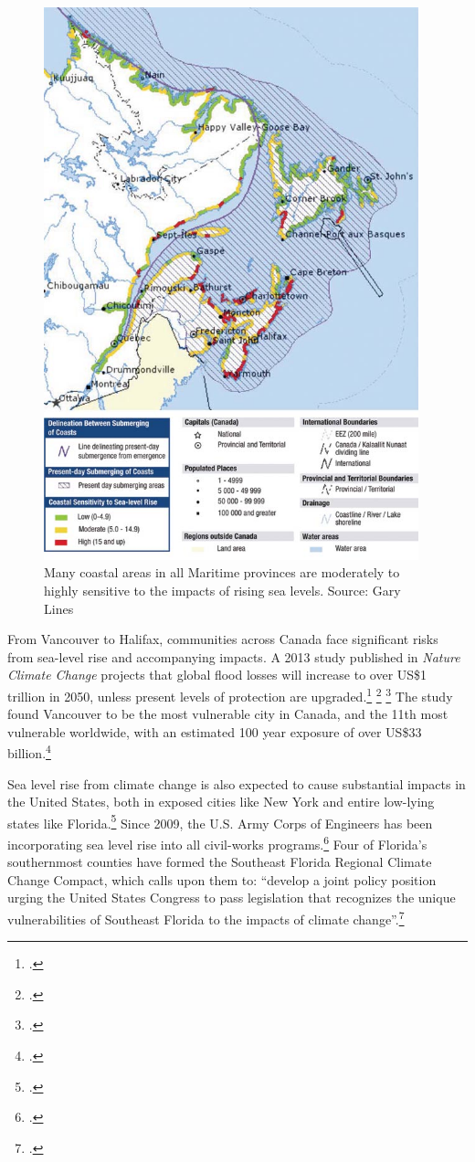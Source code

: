 \begin{figure}
\includegraphics[height=160mm]{s3-coastalsealevel.png}
\centering
\caption{Many coastal areas in all Maritime provinces are moderately to highly sensitive to the impacts of rising sea  levels. Source: Gary Lines}
\label{fig:s3-coastalsealevel}
\end{figure}



From Vancouver to Halifax, communities across Canada face significant risks from sea-level rise and accompanying impacts. A 2013 study published in \emph{Nature Climate Change} projects that global flood losses will increase to over US\$1 trillion in 2050, unless present levels of protection are upgraded.\footcite[][]{Hallegatte2013} \footcite[See also: ][]{Moore2013} \footcite[][]{VancouverFlooding2013}
The study found Vancouver to be the most vulnerable city in Canada, and the 11th most vulnerable worldwide, with an estimated 100 year exposure of over US\$33 billion.\footcite[][p. 2]{Hallegatte2013}



Sea level rise from climate change is also expected to cause substantial impacts in the United States, both in exposed cities like New York and entire low-lying states like Florida.\footcite[][]{EconGetWet}
Since 2009, the U.S. Army Corps of Engineers has been incorporating sea level rise into all civil-works programs.\footcite[][]{CorpsEngSeaLevel}
Four of Florida's southernmost counties have formed the Southeast Florida Regional Climate Change Compact, which calls upon them to: ``develop a joint policy position urging the United States Congress to pass legislation that recognizes the unique vulnerabilities of Southeast Florida to the impacts of climate change''.\footcite[][]{SouthEastFloridaCompact}



